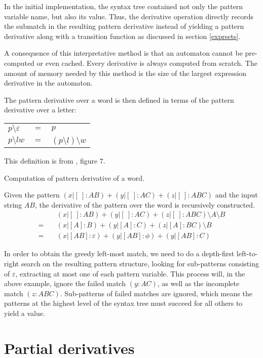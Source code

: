 In the initial implementation, the syntax tree contained not only the pattern
variable name, but also its value. Thus, the derivative operation directly
records the submatch in the resulting pattern derivative instead of yielding a
pattern derivative along with a transition function as discussed in section
\ref{exprsets}.

A consequence of this interpretative method is that an automaton cannot be
pre-computed or even cached. Every derivative is always computed from scratch.
The amount of memory needed by this method is the size of the largest expression
derivative in the automaton.

The pattern derivative over a word is then defined in terms of the pattern
derivative over a letter:

\begin{tabular}{lrl}
   $p \setminus \varepsilon$	& $=$ & $p$				\\
   $p \setminus lw$		& $=$ & $(p \setminus l) \setminus w$	\\
\end{tabular}

This definition is from \cite{pdpat}, figure 7.

\begin{eg}
   Computation of pattern derivative of a word.

   Given the pattern $(x|[\:]:AB)+(y|[\:]:AC)+(z|[\:]:ABC)$ and the input string $AB$,
   the derivative of the pattern over the word is recursively constructed.
   \begin{align*}
        &\quad (x|[\:]:AB)+(y|[\:]:AC)+(z|[\:]:ABC) \setminus A \setminus B \\
      = &\quad (x|[A]:B)+(y|[A]:C)+(z|[A]:BC) \setminus B \\
      = &\quad (x|[AB]:\varepsilon)+(y|[AB]:\phi)+(y|[AB]:C)
   \end{align*}
\end{eg}

In order to obtain the greedy left-most match, we need to do a depth-first
left-to-right search on the resulting pattern structure, looking for
sub-patterns consisting of $\varepsilon$, extracting at most one of each pattern
variable. This process will, in the above example, ignore the failed match
$(y:AC)$, as well as the incomplete match $(z:ABC)$. Sub-patterns of failed
matches are ignored, which means the patterns at the highest level of the syntax
tree must succeed for all others to yield a value.


\section{Partial derivatives}

